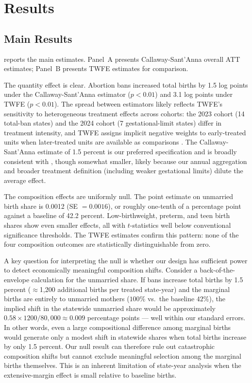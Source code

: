 \documentclass[12pt]{article}
\begin{document}
\section{Results}
\label{sec:results}

\subsection{Main Results}

 reports the main estimates. Panel~A presents Callaway-Sant'Anna overall ATT estimates; Panel~B presents TWFE estimates for comparison.

The quantity effect is clear. Abortion bans increased total births by 1.5 log points under the Callaway-Sant'Anna estimator ($p < 0.01$) and 3.1 log points under TWFE ($p < 0.01$). The spread between estimators likely reflects TWFE's sensitivity to heterogeneous treatment effects across cohorts: the 2023 cohort (14 total-ban states) and the 2024 cohort (7 gestational-limit states) differ in treatment intensity, and TWFE assigns implicit negative weights to early-treated units when later-treated units are available as comparisons \citep{goodman2021difference}. The Callaway-Sant'Anna estimate of 1.5 percent is our preferred specification and is broadly consistent with \citet{myers2024effects}, though somewhat smaller, likely because our annual aggregation and broader treatment definition (including weaker gestational limits) dilute the average effect.

The composition effects are uniformly null. The point estimate on unmarried birth share is 0.0012 (SE $= 0.0016$), or roughly one-tenth of a percentage point against a baseline of 42.2 percent. Low-birthweight, preterm, and teen birth shares show even smaller effects, all with $t$-statistics well below conventional significance thresholds. The TWFE estimates confirm this pattern: none of the four composition outcomes are statistically distinguishable from zero.

A key question for interpreting the null is whether our design has sufficient power to detect economically meaningful composition shifts. Consider a back-of-the-envelope calculation for the unmarried share. If bans increase total births by 1.5 percent ($\approx$1,200 additional births per treated state-year) and the marginal births are entirely to unmarried mothers ($100\%$ vs.\ the baseline $42\%$), the implied shift in the statewide unmarried share would be approximately $0.58 \times 1200 / 80{,}000 \approx 0.009$ percentage points --- well within our standard errors. In other words, even a large compositional difference among marginal births would generate only a modest shift in statewide shares when total births increase by only 1.5 percent. Our null result can therefore rule out catastrophic composition shifts but cannot exclude meaningful selection among the marginal births themselves. This is an inherent limitation of state-year analysis when the extensive-margin effect is small relative to baseline births.
\end{document}

